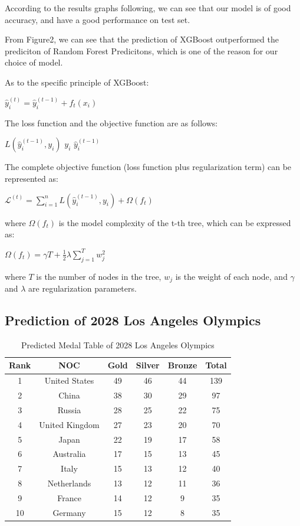 According to the results graphs following, we can see that our model is of good accuracy, and have a good performance on test set.


From Figure2, we can see that the prediction of XGBoost outperformed the prediciton of Random Forest Predicitons, which is one of the reason for our choice of model.

As to the specific principle of XGBoost:

\begin{center}
    $\hat{y}_i^{(t)} = \hat{y}_i^{(t-1)} + f_t(x_i)$
\end{center}

The loss function and the objective function are as follows:

$L(\hat{y}_i^{(t-1)}, y_i)$ \quad {} $y_i$  $\hat{y}_i^{(t-1)}$

The complete objective function (loss function plus regularization term) can be represented as:
\begin{center}
    $\mathcal{L}^{(t)} = \sum_{i=1}^n L(\hat{y}_i^{(t-1)}, y_i) + \Omega(f_t)$
\end{center}

where $\Omega(f_t)$ is the model complexity of the t-th tree, which can be expressed as:

\begin{center}
    $\Omega(f_t) = \gamma T + \frac{1}{2} \lambda \sum_{j=1}^T w_j^2$
\end{center}

where $T$ is the number of nodes in the tree, $w_j$ is the weight of each node, and $\gamma$ and $\lambda$ are regularization parameters.

\subsection{Prediction of 2028 Los Angeles Olympics}
\begin{table}[htbp]
    \centering
    \caption{Predicted Medal Table of 2028 Los Angeles Olympics}
    \begin{tabular}{|c|c|c|c|c|c|}
        \hline
        Rank & NOC & Gold & Silver & Bronze & Total \\
        \hline
        1 & United States & 49 & 46 & 44 & 139 \\
        2 & China & 38 & 30 & 29 & 97 \\
        3 & Russia & 28 & 25 & 22 & 75 \\
        4 & United Kingdom & 27 & 23 & 20 & 70 \\
        5 & Japan & 22 & 19 & 17 & 58 \\
        6 & Australia & 17 & 15 & 13 & 45 \\
        7 & Italy & 15 & 13 & 12 & 40 \\
        8 & Netherlands & 13 & 12 & 11 & 36 \\
        9 & France & 14 & 12 & 9 & 35 \\
        10 & Germany & 15 & 12 & 8 & 35 \\
        \hline
    \end{tabular}
    \label{tab:2028}
\end{table}

